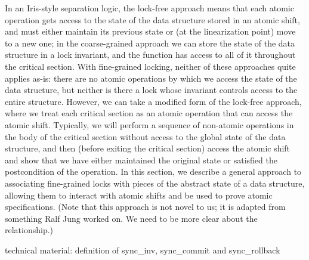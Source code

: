 \documentclass[acmsmall,screen]{acmart}\settopmatter{printfolios=true}
\begin{document}
In an Iris-style separation logic, the lock-free approach means that each atomic operation gets access to the state of the data structure stored in an atomic shift, and must either maintain its previous state or (at the linearization point) move to a new one; in the coarse-grained approach we can store the state of the data structure in a lock invariant, and the function has access to all of it throughout the critical section. With fine-grained locking, neither of these approaches quite applies as-is: there are no atomic operations by which we access the state of the data structure, but neither is there a lock whose invariant controls access to the entire structure. However, we can take a modified form of the lock-free approach, where we treat each critical section as an atomic operation that can access the atomic shift. Typically, we will perform a sequence of non-atomic operations in the body of the critical section without access to the global state of the data structure, and then (before exiting the critical section) access the atomic shift and show that we have either maintained the original state or satisfied the postcondition of the operation. In this section, we describe a general approach to associating fine-grained locks with pieces of the abstract state of a data structure, allowing them to interact with atomic shifts and be used to prove atomic specifications. (Note that this approach is not novel to us; it is adapted from something Ralf Jung worked on. We need to be more clear about the relationship.)

technical material: definition of sync\_inv, sync\_commit and sync\_rollback
\end{document}
